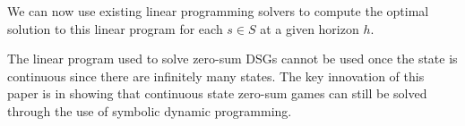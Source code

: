 We can now use existing linear programming solvers to compute the optimal
solution to this linear program for each $s \in S$ at a given horizon $h$.

The linear program used to solve zero-sum DSGs cannot be used once
the state is continuous since there are infinitely many states. The key 
innovation of this paper is in showing that continuous state zero-sum
games can still be solved through the use of symbolic dynamic programming.
